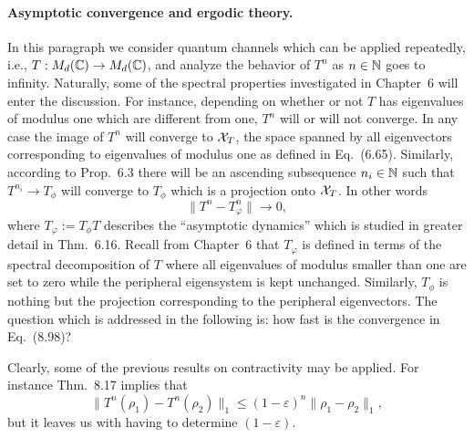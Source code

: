 \documentclass[11pt,a4paper]{article}
\theoremstyle{plain}
\theoremstyle{definition}
\theoremstyle{remark}
\begin{document}
\paragraph{Asymptotic convergence and ergodic theory.}
In this paragraph we consider quantum channels which can be applied repeatedly, i.e., $T:M_d(\mathbb{C})\to M_d(\mathbb{C})$, and analyze the behavior of $T^n$ as $n\in\mathbb{N}$ goes to infinity.
Naturally, some of the spectral properties investigated in Chapter~6 will enter the discussion. For instance, depending on whether or not $T$ has eigenvalues of modulus
one which are different from one, $T^n$ will or will not converge. In any case the image of $T^n$ will converge to $\mathcal{X}_T$, the space spanned by all eigenvectors corresponding
to eigenvalues of modulus one as defined in Eq.~(6.65). Similarly, according to Prop.~6.3 there will be an ascending subsequence $n_i\in\mathbb{N}$ such that $T^{n_i}\to T_\phi$ will converge
to $T_\phi$ which is a projection onto $\mathcal{X}_T$. In other words
\begin{equation}\tag{8.98}
    \|T^n - T_\varphi^n\|\to 0,
\end{equation}
where $T_\varphi := T_\phi T$ describes the ``asymptotic dynamics'' which is studied in greater detail in Thm.~6.16. Recall from Chapter~6 that $T_\varphi$ is defined in terms of
the spectral decomposition of $T$ where all eigenvalues of modulus smaller than one are set to zero while the peripheral eigensystem is kept unchanged. Similarly, $T_\phi$ is nothing but
the projection corresponding to the peripheral eigenvectors. The question which is addressed in the following is: how fast is the convergence in Eq.~(8.98)?

Clearly, some of the previous results on contractivity may be applied. For instance Thm.~8.17 implies that
\[
    \|T^n(\rho_1)-T^n(\rho_2)\|_1 \le (1-\varepsilon)^n\|\rho_1-\rho_2\|_1,
\]
but it leaves us with having to determine $(1-\varepsilon)$.
\end{document}
